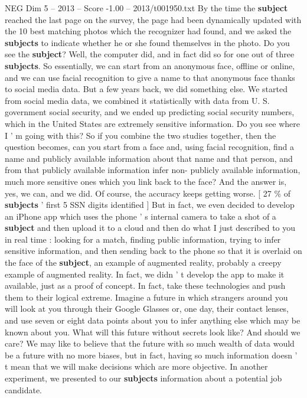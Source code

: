 \begin{textsample}{NEG Dim 5 – 2013 – Score -1.00 – 2013/t001950.txt}
By the time the \textbf{subject} reached the last page on the survey, the page had been dynamically updated with the 10 best matching photos which the recognizer had found, and we asked the \textbf{subjects} to indicate whether he or she found themselves in the photo.
Do you see the \textbf{subject}?
Well, the computer did, and in fact did so for one out of three \textbf{subjects}.
So essentially, we can start from an anonymous face, offline or online, and we can use facial recognition to give a name to that anonymous face thanks to social media data.
But a few years back, we did something else.
We started from social media data, we combined it statistically with data from U.
S. government social security, and we ended up predicting social security numbers, which in the United States are extremely sensitive information.
Do you see where I ' m going with this?
So if you combine the two studies together, then the question becomes, can you start from a face and, using facial recognition, find a name and publicly available information about that name and that person, and from that publicly available information infer non- publicly available information, much more sensitive ones which you link back to the face?
And the answer is, yes, we can, and we did.
Of course, the accuracy keeps getting worse. [ 27 \% of \textbf{subjects} ' first 5 SSN digits identified ] But in fact, we even decided to develop an iPhone app which uses the phone ' s internal camera to take a shot of a \textbf{subject} and then upload it to a cloud and then do what I just described to you in real time : looking for a match, finding public information, trying to infer sensitive information, and then sending back to the phone so that it is overlaid on the face of the \textbf{subject}, an example of augmented reality, probably a creepy example of augmented reality.
In fact, we didn ' t develop the app to make it available, just as a proof of concept.
In fact, take these technologies and push them to their logical extreme.
Imagine a future in which strangers around you will look at you through their Google Glasses or, one day, their contact lenses, and use seven or eight data points about you to infer anything else which may be known about you.
What will this future without secrets look like?
And should we care?
We may like to believe that the future with so much wealth of data would be a future with no more biases, but in fact, having so much information doesn ' t mean that we will make decisions which are more objective.
In another experiment, we presented to our \textbf{subjects} information about a potential job candidate.

\end{textsample}
